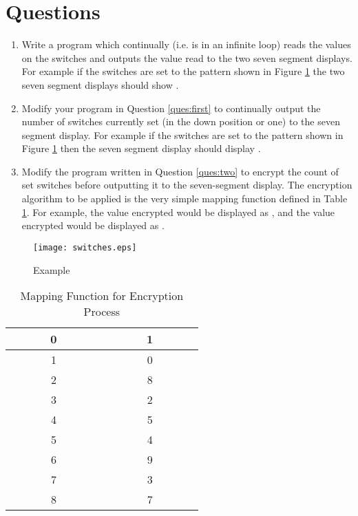 \documentclass[a4paper,10pt]{article}
\begin{document}
\section{Questions}
\begin{enumerate}
\item\label{ques:first} Write a program which continually (i.e. is in
an infinite loop) reads the values on the switches and outputs the
value read to the two seven segment displays.  For example if the
switches are set to the pattern shown in Figure \ref{fig:switches} the
two seven segment displays should show .

\item\label{ques:two} Modify your program in Question \ref{ques:first}
to continually output the number of switches currently set (in the
down position or one) to the seven segment display. For example if the
switches are set to the pattern shown in Figure \ref{fig:switches}
then the seven segment display should display .

\item\label{ques:final} Modify the program written in Question
\ref{ques:two} to encrypt the count of set switches before outputting
it to the seven-segment display. The encryption algorithm to be
applied is the very simple mapping function defined in Table
\ref{table:encode}. For example, the value  encrypted would be
displayed as , and the value  encrypted would be
displayed as .
\end{enumerate}

\begin{figure}[!hb]
\begin{center}
\texttt{[image: switches.eps]}
\caption{Example}
\label{fig:switches}
\end{center}
\end{figure}


\begin{table}
\begin{center}
\begin{tabular}{|c|c|}
\hline
\verb|       |0\verb|       | & \verb|       |1\verb|       | \\ \hline
1 & 0 \\ \hline
2 & 8 \\ \hline
3 & 2 \\ \hline
4 & 5 \\ \hline
5 & 4 \\ \hline
6 & 9 \\ \hline
7 & 3 \\ \hline
8 & 7 \\ 
\hline
\end{tabular}
\end{center}
\label{table:encode}
\caption{Mapping Function for Encryption Process}
\end{table}
\end{document}
